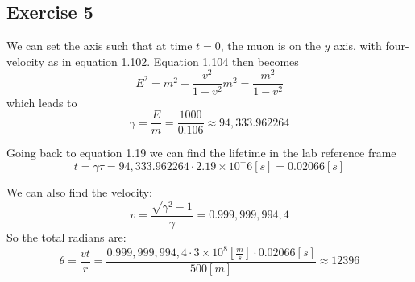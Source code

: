 \subsection{Exercise 5}
We can set the axis such that at time $t=0$, the muon is on the $y$  axis, with four-velocity as in equation 1.102. Equation 1.104 then becomes
\begin{equation}
    E^2=m^2+\frac{v^2}{1-v^2}m^2=\frac{m^2}{1-v^2}
\end{equation}
which leads to
\begin{equation}
    \gamma = \frac{E}{m} = \frac{1000}{0.106} \approx 94,333.962264
\end{equation}

Going back to equation 1.19 we can find the lifetime in the lab reference frame
\begin{equation}
    t = \gamma \tau = 94,333.962264 \cdot 2.19\times 10^-6 [s] = 0.02066[s]
\end{equation}

We can also find the velocity:
\begin{equation}
    v = \frac{\sqrt{\gamma^2 - 1}}{\gamma} = 0.999,999,994,4
\end{equation}
So the total radians are:
\begin{equation}
    \theta = \frac{vt}{r} = \frac{0.999,999,994,4 \cdot 3\times10^8 [\frac{m}{s}] \cdot 0.02066 [s]}{500[m]} \approx 12396
\end{equation}

